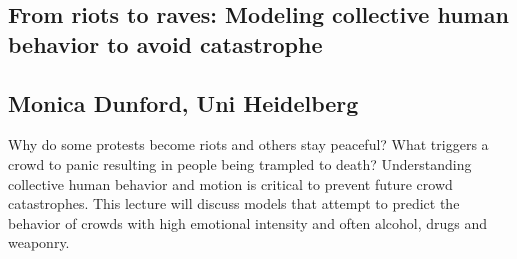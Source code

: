 \subsection*{From riots to raves: Modeling collective human behavior to avoid catastrophe}
\subsection*{Monica Dunford, Uni Heidelberg}
\noindent Why do some protests become riots and others stay peaceful? What
triggers a crowd to panic resulting in people being trampled to death?
Understanding collective human behavior and motion is critical to prevent
future crowd catastrophes. This lecture will discuss models that attempt to
predict the behavior of crowds with high emotional intensity and often
alcohol, drugs and weaponry. 
